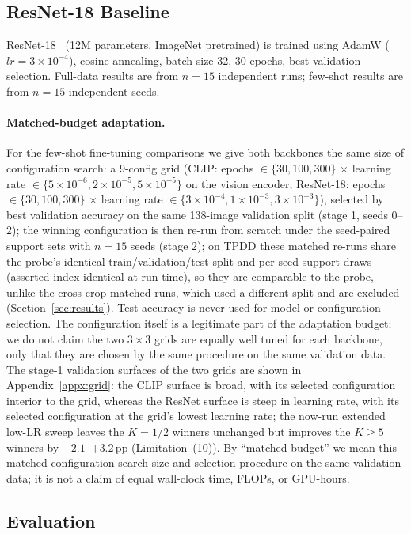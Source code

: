 \documentclass[10pt,a4paper]{article}
\begin{document}
\subsection{ResNet-18 Baseline}

ResNet-18~\cite{he2016deep} (12M parameters, ImageNet pretrained) is trained using AdamW ($lr=3\times10^{-4}$), cosine annealing, batch size 32, 30 epochs, best-validation selection.
Full-data results are from $n=15$ independent runs; few-shot results are from $n=15$ independent seeds.
\paragraph{Matched-budget adaptation.} For the few-shot fine-tuning comparisons we give both backbones the same size of configuration search: a 9-config grid (CLIP: epochs $\in\{30,100,300\}$ $\times$ learning rate $\in\{5\times10^{-6},2\times10^{-5},5\times10^{-5}\}$ on the vision encoder; ResNet-18: epochs $\in\{30,100,300\}$ $\times$ learning rate $\in\{3\times10^{-4},1\times10^{-3},3\times10^{-3}\}$), selected by best validation accuracy on the same 138-image validation split (stage 1, seeds 0--2); the winning configuration is then re-run from scratch under the seed-paired support sets with $n=15$ seeds (stage 2); on TPDD these matched re-runs share the probe's identical train/validation/test split and per-seed support draws (asserted index-identical at run time), so they are comparable to the probe, unlike the cross-crop matched runs, which used a different split and are excluded (Section~\ref{sec:results}). Test accuracy is never used for model or configuration selection. The configuration itself is a legitimate part of the adaptation budget; we do not claim the two $3\times3$ grids are equally well tuned for each backbone, only that they are chosen by the same procedure on the same validation data. The stage-1 validation surfaces of the two grids are shown in Appendix~\ref{appx:grid}: the CLIP surface is broad, with its selected configuration interior to the grid, whereas the ResNet surface is steep in learning rate, with its selected configuration at the grid's lowest learning rate; the now-run extended low-LR sweep leaves the $K{=}1/2$ winners unchanged but improves the $K{\geq}5$ winners by $+2.1$--$+3.2$\,pp (Limitation~(10)). By ``matched budget'' we mean this matched configuration-search size and selection procedure on the same validation data; it is not a claim of equal wall-clock time, FLOPs, or GPU-hours.

\subsection{Evaluation}
\end{document}
